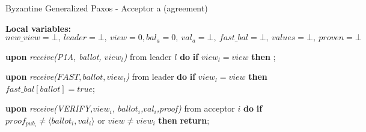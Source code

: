 \begin{algorithm} 
	\caption{Byzantine Generalized Paxos - Acceptor a (agreement)}
	\label{BFT-Acc}
	\textbf{Local variables:} $new\_view = \bot,\ leader = \bot,\ view = 0, bal_a = 0,\ val_a = \bot,\ fast\_bal = \bot,\ values=\bot,\ proven = \bot$
	\begin{algorithmic}[1]
		\State \textbf{upon} \textit{receive(P1A, ballot, $view_l$)} from leader $l$ \textbf{do}
		\State \hspace{\algorithmicindent} \textbf{if} $view_l = view$ \textbf{then}
		\State \hspace{\algorithmicindent}\hspace{\algorithmicindent} ;
		
		\State
		\State \textbf{upon} \textit{receive($FAST,ballot,view_l$)} from leader \textbf{do}
		\State \hspace{\algorithmicindent} \textbf{if} $view_l = view$ \textbf{then}
		\State \hspace{\algorithmicindent}\hspace{\algorithmicindent} $fast\_bal[ballot] = true$;
		
		\iffalse	\State
		\State \textbf{upon} \textit{receive(P2B,ballot,value,proof)} from acceptor $i$ \textbf{do}
		\State \hspace{\algorithmicindent} \textbf{if} $proof_{pub_i} \neq \langle ballot, value \rangle$ \textbf{then}
		\State \hspace{\algorithmicindent}\hspace{\algorithmicindent} \textbf{return};
		\State \hspace{\algorithmicindent} $checkpoint[ballot][i] = proof$;
		\State \hspace{\algorithmicindent} \textbf{if} $\#(checkpoint[ballot]) \geq N-f$ \textbf{then}
		\State \hspace{\algorithmicindent}\hspace{\algorithmicindent} $\Call{send}{P2B, ballot, value, checkpoint[ballot]}$ to learners;
		\State \hspace{\algorithmicindent}\hspace{\algorithmicindent} $val_a = \bot$;
		\fi
		\State
		\State \textbf{upon} \textit{receive(VERIFY,$view_i$, $ballot_i$,$val_i$,proof)} from acceptor $i$ \textbf{do}
		\State \hspace{\algorithmicindent} \textbf{if} $proof_{pub_i} \neq \langle ballot_i, val_i \rangle$ or $view \neq view_i$ \textbf{then}
		\State \hspace{\algorithmicindent}\hspace{\algorithmicindent} \textbf{return};
		\State
		

\end{algorithmic}
\end{algorithm}
